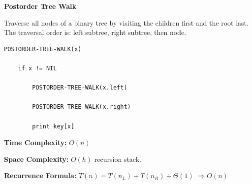\documentclass[a4paper,12pt]{article}
\begin{document}
\begin{tcolorbox}[
    colback=gray!30,
    colframe=black,
    boxrule=1pt,
    arc=0mm
]

\begin{tcolorbox}[
    colback=gray!10,
    colframe=black,
    arc=0mm
]
\centering
{\Huge\bfseries Postorder Tree Walk}
\end{tcolorbox}


\begin{tcolorbox}[
    colback=gray!10,
    colframe=black,
    arc=0mm
]
\small
Traverse all nodes of a binary tree by visiting the children first
and the root last.
The traversal order is: left subtree, right subtree, then node.
\end{tcolorbox}


\begin{tcolorbox}[
    colback=black!5,
    colframe=black,
    arc=0mm,
    title=Pseudo-code
]
\tiny
\begin{lstlisting}
POSTORDER-TREE-WALK(x)

    if x != NIL

        POSTORDER-TREE-WALK(x.left)

        POSTORDER-TREE-WALK(x.right)

        print key[x]
\end{lstlisting}
\end{tcolorbox}


\begin{tcolorbox}[
    colback=cyan!20,
    colframe=black,
    arc=0mm
]
\small
\textbf{Time Complexity:}
$O(n)$
\end{tcolorbox}


\begin{tcolorbox}[
    colback=violet!20,
    colframe=black,
    arc=0mm
]
\small
\textbf{Space Complexity:}
$O(h)$ recursion stack.
\end{tcolorbox}


\begin{tcolorbox}[
    colback=pink!20,
    colframe=black,
    arc=0mm
]
\small
\textbf{Recurrence Formula:}
$T(n)=T(n_L)+T(n_R)+\Theta(1)$
$\Rightarrow O(n)$
\end{tcolorbox}

\end{tcolorbox}
\end{document}

